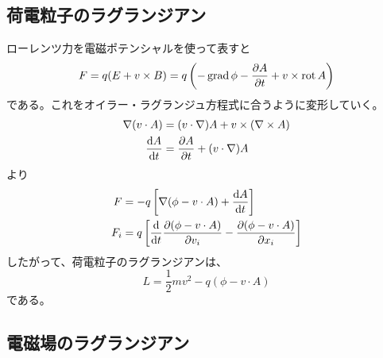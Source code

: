 \subsection{荷電粒子のラグランジアン}
    ローレンツ力を電磁ポテンシャルを使って表すと
        \[F = q(E + v \times B) = q\left(-\grad\phi - \pd[A]{t} + v \times \rot A\right)\]
    である。これをオイラー・ラグランジュ方程式に合うように変形していく。
    \begin{align*}
        \nabla(v \cdot A) &= (v \cdot \nabla)A + v \times (\nabla \times A)\\
        \dv{A}{t} &= \pd[A]{t} + (v \cdot \nabla)A
    \end{align*}
    より
    \begin{align*}
        F &= -q \left[\nabla(\phi - v\cdot A) + \dv{A}{t}\right]\\
        F_i &= q\left[\dv{t}\pd[(\phi - v\cdot A)]{v_i} - \pd[(\phi - v\cdot A)]{x_i}\right]
    \end{align*}
    したがって、荷電粒子のラグランジアンは、
        \[L = \frac{1}{2}mv^2 - q(\phi - v\cdot A)\]
    である。

\subsection{電磁場のラグランジアン}